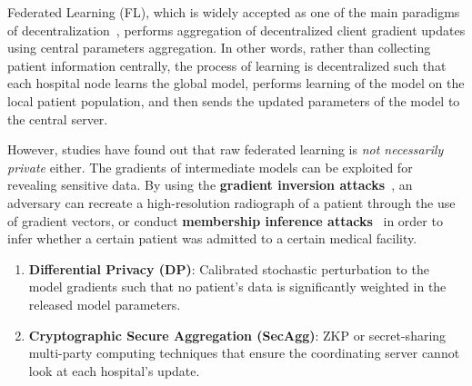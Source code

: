 \documentclass[12pt,a4paper]{report}
\begin{document}
Federated Learning (FL), which is widely accepted as one of the main paradigms of decentralization~\cite{kairouz2021advances, li2021survey}, performs aggregation of decentralized client gradient updates using central parameters aggregation. In other words, rather than collecting patient information centrally, the process of learning is decentralized such that each hospital node learns the global model, performs learning of the model on the local patient population, and then sends the updated parameters of the model to the central server.

However, studies have found out that raw federated learning is \emph{not necessarily private} either. The gradients of intermediate models can be exploited for revealing sensitive data. By using the \textbf{gradient inversion attacks}~\cite{geiping2020inverting, yin2021see}, an adversary can recreate a high-resolution radiograph of a patient through the use of gradient vectors, or conduct \textbf{membership inference attacks}~\cite{nasr2021inference} in order to infer whether a certain patient was admitted to a certain medical facility.
\begin{enumerate}
   \item \textbf{Differential Privacy (DP)}: Calibrated stochastic perturbation to the model gradients such that no patient’s data is significantly weighted in the released model parameters.
    \item \textbf{Cryptographic Secure Aggregation (SecAgg)}: ZKP or secret-sharing multi-party computing techniques that ensure the coordinating server cannot look at each hospital’s update.
\end{enumerate}
\end{document}
